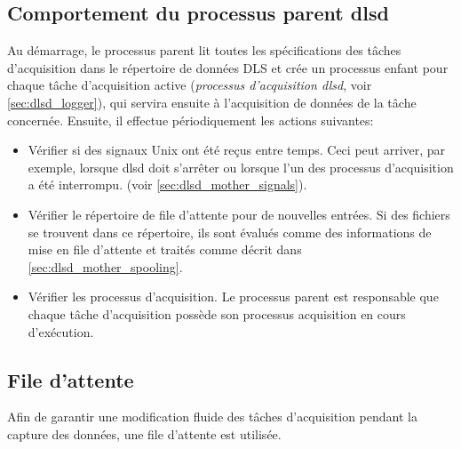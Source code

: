 \documentclass[a4paper,12pt,BCOR6mm,bibtotoc,idxtotoc]{scrbook}
\begin{document}

\subsection{Comportement du processus parent dlsd}
\label{sec:dlsd_mother_behaviour}

Au d\'emarrage, le processus parent lit toutes les sp\'ecifications
des t\^aches d'acquisition dans le r\'epertoire de donn\'ees DLS et
cr\'ee un processus enfant pour chaque t\^ache d'acquisition active
 (\textit{processus d'acquisition dlsd}, voir
\autoref{sec:dlsd_logger}), qui servira ensuite \`a l'acquisition de
donn\'ees de la t\^ache concern\'ee.  Ensuite, il effectue
p\'eriodiquement les actions suivantes:

\begin{itemize}

\item V\'erifier si des signaux Unix ont \'et\'e re\c cus entre temps.
  Ceci peut arriver, par exemple, lorsque dlsd doit s'arr\^eter ou
  lorsque l'un des processus d'acquisition a \'et\'e interrompu.
  (voir \autoref{sec:dlsd_mother_signals}).

\item V\'erifier le r\'epertoire de file d'attente pour de nouvelles
  entr\'ees.  Si des fichiers se trouvent dans ce r\'epertoire, ils
  sont \'evalu\'es comme des informations de mise en file d'attente et
  trait\'es comme d\'ecrit dans \autoref{sec:dlsd_mother_spooling}.

\item V\'erifier les processus d'acquisition. Le processus parent est
  responsable que chaque t\^ache d'acquisition poss\`ede son processus
  acquisition en cours d'ex\'ecution.

\end{itemize}


\subsection{File d'attente} \label{sec:dlsd_mother_spooling} 

Afin de garantir une modification fluide des t\^aches d'acquisition
 pendant la capture des donn\'ees, une
file d'attente est utilis\'ee.
\end{document}
